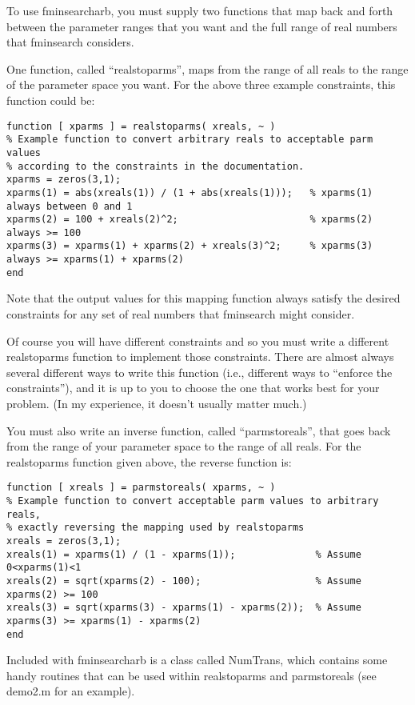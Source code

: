\documentclass{article}
\begin{document}
To use fminsearcharb, you must supply two functions that map back and forth between the
parameter ranges that you want and the full range of real numbers that fminsearch considers.

One function, called ``realstoparms'', maps from the range of all reals to the
range of the parameter space you want.
For the above three example constraints, this function could be:
\begin{verbatim}
function [ xparms ] = realstoparms( xreals, ~ )
% Example function to convert arbitrary reals to acceptable parm values
% according to the constraints in the documentation.
xparms = zeros(3,1);
xparms(1) = abs(xreals(1)) / (1 + abs(xreals(1)));   % xparms(1) always between 0 and 1
xparms(2) = 100 + xreals(2)^2;                       % xparms(2) always >= 100
xparms(3) = xparms(1) + xparms(2) + xreals(3)^2;     % xparms(3) always >= xparms(1) + xparms(2)
end
\end{verbatim}
Note that the output values for this mapping function always satisfy the desired
constraints for any set of real numbers that fminsearch might consider.

Of course you will have different constraints and so you must write a different
realstoparms function to implement those constraints.
There are almost always several different ways to write this function (i.e.,
different ways to ``enforce the constraints''), and it is up to you to choose
the one that works best for your problem.
(In my experience, it doesn't usually matter much.)

You must also write an inverse function, called ``parmstoreals'', that goes back
from the range of your parameter space to the range of all reals.
For the realstoparms function given above, the reverse function is:
\begin{verbatim}
function [ xreals ] = parmstoreals( xparms, ~ )
% Example function to convert acceptable parm values to arbitrary reals,
% exactly reversing the mapping used by realstoparms
xreals = zeros(3,1);
xreals(1) = xparms(1) / (1 - xparms(1));              % Assume 0<xparms(1)<1
xreals(2) = sqrt(xparms(2) - 100);                    % Assume xparms(2) >= 100
xreals(3) = sqrt(xparms(3) - xparms(1) - xparms(2));  % Assume xparms(3) >= xparms(1) - xparms(2)
end
\end{verbatim}

Included with fminsearcharb is a class called NumTrans, which contains some handy routines
that can be used within realstoparms and parmstoreals (see demo2.m for an example).
\end{document}
